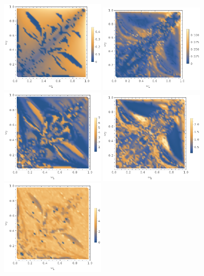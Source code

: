 \documentclass{report}
\begin{document}
\begin{figure}[p]
  \centering
  \includegraphics[width=0.45\textwidth]{plot/energy-ratio-sine-2d.png}
  \includegraphics[width=0.45\textwidth]{plot/energy-ratio-sine-3d.png} \\
  \includegraphics[width=0.45\textwidth]{plot/r_max-sine-2d.png}
  \includegraphics[width=0.45\textwidth]{plot/r_max-sine-3d.png} \\
  \includegraphics[width=0.45\textwidth]{plot/slow-mode-logscale-sine-2d.png}

\end{figure}
\end{document}
